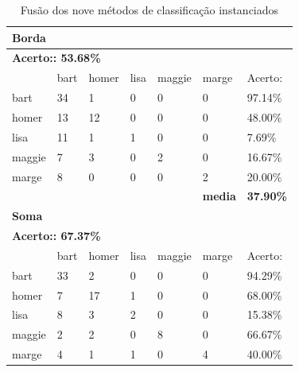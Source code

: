 \documentclass[journal]{IEEEtran}
\begin{document}
\begin{table}[!htb]
\centering
\caption{Fusão dos nove métodos de classificação instanciados}
\label{tbl:fusionall}
\small
\singlespacing
\begin{tabular}{l|l|l|l|l|l|l}
\hline
\multicolumn{7}{l}{\textbf{Borda}}                                                          \\ \hline
\multicolumn{7}{l}{\textbf{Acerto:: 53.68\%}}                                                 \\ \hline
          & bart      & homer     & lisa      & maggie    & marge          & Acerto:            \\ \hline
bart      & 34        & 1         & 0         & 0         & 0              & 97.14\%          \\ \hline
homer     & 13        & 12        & 0         & 0         & 0              & 48.00\%          \\ \hline
lisa      & 11        & 1         & 1         & 0         & 0              & 7.69\%           \\ \hline
maggie    & 7         & 3         & 0         & 2         & 0              & 16.67\%          \\ \hline
marge     & 8         & 0         & 0         & 0         & 2              & 20.00\%          \\ \hline
\textbf{} & \textbf{} & \textbf{} & \textbf{} & \textbf{} & \textbf{media} & \textbf{37.90\%} \\ \hline
\multicolumn{7}{l}{\textbf{Soma}}                                                            \\ \hline
\multicolumn{7}{l}{\textbf{Acerto:: 67.37\%}}                                                 \\ \hline
          & bart      & homer     & lisa      & maggie    & marge          & Acerto:            \\ \hline
bart      & 33        & 2         & 0         & 0         & 0              & 94.29\%          \\ \hline
homer     & 7         & 17        & 1         & 0         & 0              & 68.00\%          \\ \hline
lisa      & 8         & 3         & 2         & 0         & 0              & 15.38\%          \\ \hline
maggie    & 2         & 2         & 0         & 8         & 0              & 66.67\%          \\ \hline
marge     & 4         & 1         & 1         & 0         & 4              & 40.00\%          \\ \hline

\end{tabular}
\end{table}
\end{document}
